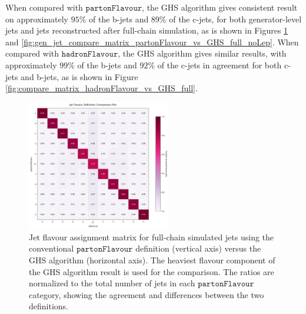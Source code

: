 \documentclass[10pt,twocolumn]{article}
\newcommand*{\parFlav}{\texttt{partonFlavour}}
\newcommand*{\hadFlav}{\texttt{hadronFlavour}}
\begin{document}
When compared with $\parFlav$, the GHS algorithm gives consistent result on approximately $95\%$ of the b-jets and $89\%$ of the c-jets, for both generator-level jets and jets reconstructed after full-chain simulation, as is shown in Figures \ref{fig:reco_jet_compare_matrix_partonFlavour_vs_GHS_full_noLep} and \ref{fig:gen_jet_compare_matrix_partonFlavour_vs_GHS_full_noLep}. When compared with $\hadFlav$, the GHS algorithm gives similar results, with approximately $99\%$ of the b-jets and $92\%$ of the c-jets in agreement for both c-jets and b-jets, as is shown in Figure \ref{fig:compare_matrix_hadronFlavour_vs_GHS_full}.
\begin{figure}[!bth]
    \centering
    \includegraphics[width=0.56\textwidth]{images/compare_matrix_partonFlavour_vs_GHS_full_noLep.png}
    \caption{Jet flavour assignment matrix for full-chain simulated jets using the conventional $\parFlav$ definition (vertical axis) versus the GHS algorithm (horizontal axis). The heaviest flavour component of the GHS algorithm result is used for the comparison. The ratios are normalized to the total number of jets in each $\parFlav$ category, showing the agreement and differences between the two definitions.}
    \label{fig:reco_jet_compare_matrix_partonFlavour_vs_GHS_full_noLep}
\end{figure}
\end{document}
